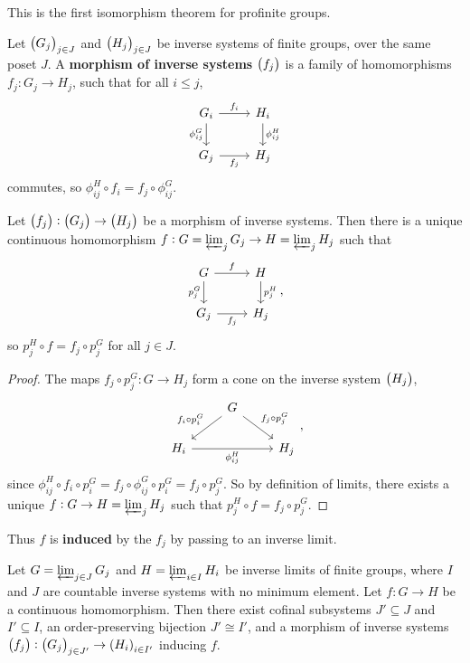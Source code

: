 This is the first isomorphism theorem for profinite groups.

\pagebreak


\begin{definition}
Let $ \br{G_j}_{j \in J} $ and $ \br{H_j}_{j \in J} $ be inverse systems of finite groups, over the same poset $ J $. A \textbf{morphism of inverse systems} $ \br{f_j} $ is a family of homomorphisms $ f_j : G_j \to H_j $, such that for all $ i \le j $,
$$
\begin{tikzcd}
G_i \arrow{r}{f_i} \arrow{d}[swap]{\phi_{ij}^G} & H_i \arrow{d}{\phi_{ij}^H} \\
G_j \arrow{r}[swap]{f_j} & H_j
\end{tikzcd}
$$
commutes, so $ \phi_{ij}^H \circ f_i = f_j \circ \phi_{ij}^G $.
\end{definition}

\begin{proposition}
Let $ \br{f_j} : \br{G_j} \to \br{H_j} $ be a morphism of inverse systems. Then there is a unique continuous homomorphism $ f : G = \varprojlim_j G_j \to H = \varprojlim_j H_j $ such that
$$
\begin{tikzcd}
G \arrow{r}{f} \arrow{d}[swap]{p_j^G} & H \arrow{d}{p_j^H} \\
G_j \arrow{r}[swap]{f_j} & H_j
\end{tikzcd},
$$
so $ p_j^H \circ f = f_j \circ p_j^G $ for all $ j \in J $.
\end{proposition}

\begin{proof}
The maps $ f_j \circ p_j^G : G \to H_j $ form a cone on the inverse system $ \br{H_j} $,
$$
\begin{tikzcd}
& G \arrow{dl}[swap]{f_i \circ p_i^G} \arrow{dr}{f_j \circ p_j^G} & \\
H_i \arrow{rr}[swap]{\phi_{ij}^H} & & H_j
\end{tikzcd},
$$
since $ \phi_{ij}^H \circ f_i \circ p_i^G = f_j \circ \phi_{ij}^G \circ p_i^G = f_j \circ p_j^G $. So by definition of limits, there exists a unique $ f : G \to H = \varprojlim_j H_j $ such that $ p_j^H \circ f = f_j \circ p_j^G $.
\end{proof}

Thus $ f $ is \textbf{induced} by the $ f_j $ by passing to an inverse limit.

\begin{proposition}
\label{prop:2.4.11}
Let $ G = \varprojlim_{j \in J} G_j $ and $ H = \varprojlim_{i \in I} H_i $ be inverse limits of finite groups, where $ I $ and $ J $ are countable inverse systems with no minimum element. Let $ f : G \to H $ be a continuous homomorphism. Then there exist cofinal subsystems $ J' \subseteq J $ and $ I' \subseteq I $, an order-preserving bijection $ J' \cong I' $, and a morphism of inverse systems $ \br{f_j} : \br{G_j}_{j \in J'} \to \br{H_i}_{i \in I'} $ inducing $ f $.
\end{proposition}

